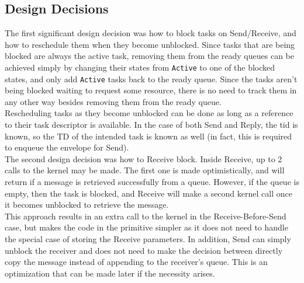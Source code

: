 \documentclass[12pt]{article}
\begin{document}
\subsection{Design Decisions}
The first significant design decision was how to block tasks on Send/Receive, and how to reschedule them when they become unblocked. Since tasks that are being blocked are always the active task, removing them from the ready queues can be achieved simply by changing their states from \texttt{Active} to one of the blocked states, and only add \texttt{Active} tasks back to the ready queue. Since the tasks aren't being blocked waiting to request some resource, there is no need to track them in any other way besides removing them from the ready queue.
\\
Rescheduling tasks as they become unblocked can be done as long as a reference to their task descriptor is available. In the case of both Send and Reply, the tid is known, so the TD of the intended task is known as well (in fact, this is required to enqueue the envelope for Send).
\\
The second design decision was how to Receive block. Inside Receive, up to 2 calls to the kernel may be made. The first one is made optimistically, and will return if a message is retrieved successfully from a queue. However, if the queue is empty, then the task is blocked, and Receive will make a second kernel call once it becomes unblocked to retrieve the message.
\\
This approach results in an extra call to the kernel in the Receive-Before-Send case, but makes the code in the primitive simpler as it does not need to handle the special case of storing the Receive parameters. In addition, Send can simply unblock the receiver and does not need to make the decision between directly copy the message instead of appending to the receiver's queue. This is an optimization that can be made later if the necessity arises.
\end{document}
